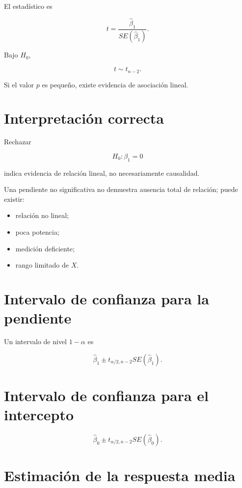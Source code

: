 \documentclass[
  spanish,
  11pt,
  letterpaper,
  DIV=11,
  numbers=noendperiod]{scrreprt}
\providecommand{\tightlist}{%
  \setlength{\itemsep}{0pt}\setlength{\parskip}{0pt}}
\theoremstyle{definition}
\theoremstyle{plain}
\theoremstyle{definition}
\theoremstyle{remark}
\begin{document}
El estadístico es

\[
t
=
\frac{
\widehat{\beta}_1
}{
SE(
\widehat{\beta}_1
)
}.
\]

Bajo \(H_0\),

\[
t\sim t_{n-2}.
\]

Si el valor \(p\) es pequeño, existe evidencia de asociación lineal.

\section{Interpretación correcta}\label{interpretaciuxf3n-correcta}

Rechazar

\[
H_0:\beta_1=0
\]

indica evidencia de relación lineal, no necesariamente causalidad.

Una pendiente no significativa no demuestra ausencia total de relación;
puede existir:

\begin{itemize}
\tightlist
\item
  relación no lineal;
\item
  poca potencia;
\item
  medición deficiente;
\item
  rango limitado de \(X\).
\end{itemize}

\section{Intervalo de confianza para la
pendiente}\label{intervalo-de-confianza-para-la-pendiente}

Un intervalo de nivel \(1-\alpha\) es

\[
\widehat{\beta}_1
\pm
t_{\alpha/2,n-2}
SE(
\widehat{\beta}_1
).
\]

\section{Intervalo de confianza para el
intercepto}\label{intervalo-de-confianza-para-el-intercepto}

\[
\widehat{\beta}_0
\pm
t_{\alpha/2,n-2}
SE(
\widehat{\beta}_0
).
\]

\section{Estimación de la respuesta
media}\label{estimaciuxf3n-de-la-respuesta-media}
\end{document}
